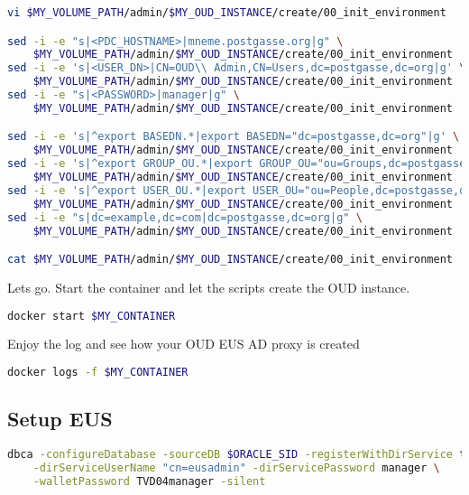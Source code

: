 \documentclass[a4paper,,tablecaptionabove]{scrartcl}
\begin{document}
\begin{lstlisting}[language=bash]
vi $MY_VOLUME_PATH/admin/$MY_OUD_INSTANCE/create/00_init_environment

sed -i -e "s|<PDC_HOSTNAME>|mneme.postgasse.org|g" \
    $MY_VOLUME_PATH/admin/$MY_OUD_INSTANCE/create/00_init_environment
sed -i -e 's|<USER_DN>|CN=OUD\\ Admin,CN=Users,dc=postgasse,dc=org|g' \
    $MY_VOLUME_PATH/admin/$MY_OUD_INSTANCE/create/00_init_environment
sed -i -e "s|<PASSWORD>|manager|g" \
    $MY_VOLUME_PATH/admin/$MY_OUD_INSTANCE/create/00_init_environment

sed -i -e 's|^export BASEDN.*|export BASEDN="dc=postgasse,dc=org"|g' \
    $MY_VOLUME_PATH/admin/$MY_OUD_INSTANCE/create/00_init_environment
sed -i -e 's|^export GROUP_OU.*|export GROUP_OU="ou=Groups,dc=postgasse,dc=org"|g' \
    $MY_VOLUME_PATH/admin/$MY_OUD_INSTANCE/create/00_init_environment
sed -i -e 's|^export USER_OU.*|export USER_OU="ou=People,dc=postgasse,dc=org"|g' \
    $MY_VOLUME_PATH/admin/$MY_OUD_INSTANCE/create/00_init_environment
sed -i -e "s|dc=example,dc=com|dc=postgasse,dc=org|g" \
    $MY_VOLUME_PATH/admin/$MY_OUD_INSTANCE/create/00_init_environment

cat $MY_VOLUME_PATH/admin/$MY_OUD_INSTANCE/create/00_init_environment
\end{lstlisting}

Lets go. Start the container and let the scripts create the OUD
instance.

\begin{lstlisting}[language=bash]
docker start $MY_CONTAINER
\end{lstlisting}

Enjoy the log and see how your OUD EUS AD proxy is created

\begin{lstlisting}[language=bash]
docker logs -f $MY_CONTAINER
\end{lstlisting}

\hypertarget{setup-eus}{%
\subsection{Setup EUS}\label{setup-eus}}

\begin{lstlisting}[language=bash]
dbca -configureDatabase -sourceDB $ORACLE_SID -registerWithDirService true \
    -dirServiceUserName "cn=eusadmin" -dirServicePassword manager \
    -walletPassword TVD04manager -silent
\end{lstlisting}
\end{document}
